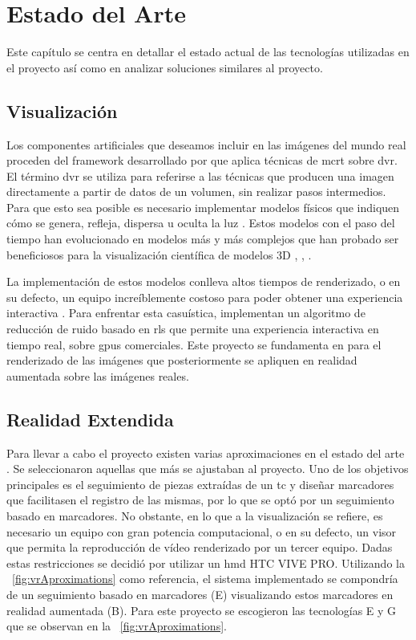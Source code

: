 \chapter{Estado del Arte}
\label{chap:ea}
Este capítulo se centra en detallar el estado actual de las tecnologías utilizadas en el proyecto así como en analizar soluciones similares al proyecto.
\section{Visualización}
Los componentes artificiales que deseamos incluir en las imágenes del mundo real proceden del framework desarrollado por \citeauthor{Kroes2012} que aplica técnicas de \acrfull{mcrt} sobre \acrfull{dvr}.
El término \acrshort{dvr} se utiliza para referirse a las técnicas que producen una imagen directamente a partir de datos de un volumen, sin realizar pasos intermedios. Para que esto sea posible es necesario implementar modelos físicos que indiquen cómo se genera, refleja, dispersa u oculta la luz \cite{Max1995}. Estos modelos con el paso del tiempo han evolucionado en modelos más y más complejos que han probado ser beneficiosos para la visualización científica de modelos 3D \cite{Daz2015}, \cite{Englund2016}, \cite{Lindemann2011}.

La implementación de estos modelos conlleva altos tiempos de renderizado, o en su defecto, un equipo increíblemente costoso para poder obtener una experiencia interactiva \cite{IglesiasGuitian2022}. Para enfrentar esta casuística, \citeauthor{IglesiasGuitian2022} implementan un algoritmo de reducción de ruido basado en \acrfull{rls} que permite una experiencia interactiva en tiempo real, sobre \acrshort{gpu}s comerciales. Este proyecto se fundamenta en \cite{IglesiasGuitian2022} para el renderizado de las imágenes que posteriormente se apliquen en realidad aumentada sobre las imágenes reales.

\section{Realidad Extendida}

Para llevar a cabo el proyecto existen varias aproximaciones en el estado del arte \cite{Venkatesan2021}. Se seleccionaron aquellas que más se ajustaban al proyecto.
Uno de los objetivos principales es el seguimiento de piezas extraídas de un \acrshort{tc} y diseñar marcadores que facilitasen el registro de las mismas, por lo que se optó por un seguimiento basado en marcadores. No obstante, en lo que a la visualización se refiere, es necesario un equipo con gran potencia computacional, o en su defecto, un visor que permita la reproducción de vídeo renderizado por un tercer equipo. Dadas estas restricciones se decidió por utilizar un \acrfull{hmd} HTC VIVE PRO. Utilizando la \figurename~\ref{fig:vrAproximations} \cite{Venkatesan2021} como referencia, el sistema implementado se compondría de un seguimiento basado en marcadores (E) visualizando estos marcadores en realidad aumentada (B).
Para este proyecto se escogieron las tecnologías E y G que se observan en la \figurename~\ref{fig:vrAproximations}.


